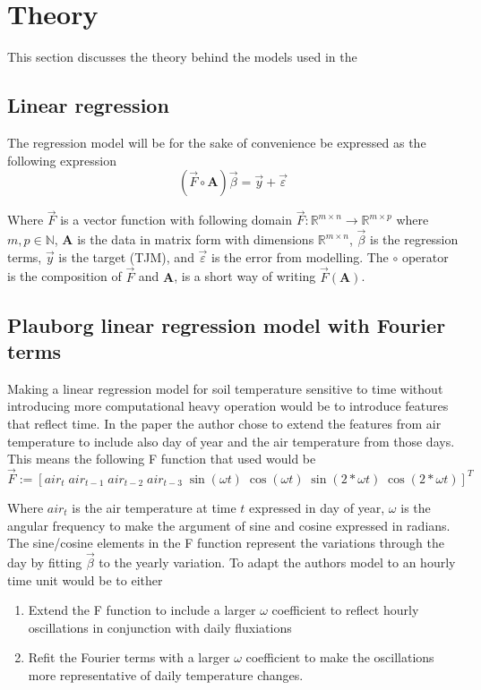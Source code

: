 \section{Theory}\label{sec:theory}

This section discusses the theory behind the models used in the 

\subsection{Linear regression}

The regression model will be for the sake of convenience be expressed as the following expression
$$
\left(\vec{F}\circ \mathbf{A}\right)\vec{\beta}=\vec{y}+\vec{\varepsilon}
$$

Where $\vec{F}$ is a vector function with following domain $\vec{F}:\mathbb{R}^{m\times n}\to \mathbb{R}^{m\times p}$ where $m,p\in \mathbb{N}$, $\mathbf{A}$ is the data in matrix form with dimensions $\mathbb{R}^{m\times n}$, $\vec{\beta}$ is the regression terms, $\vec{y}$ is the target (TJM), and $\vec{\varepsilon}$ is the error from modelling. The $\circ$ operator is the composition of $\vec{F}$ and $\mathbf{A}$, is a short way of writing $\vec{F}(\mathbf{A})$.

\subsection[Plauborg Regression]{Plauborg linear regression model with Fourier terms}

Making a linear regression model for soil temperature sensitive to time without introducing more computational heavy operation would be to introduce features that reflect time. In the paper  the author chose to extend the features from air temperature to include also day of year and the air temperature from those days. This means the following F function that \citeauthor{plauborg_simple_2002} used would be 
$$
\vec{F} := [air_t \; air_{t-1}\; air_{t-2}\; air_{t-3}\; \sin(\omega t) \; \cos(\omega t)\; \sin(2*\omega t)\; \cos(2*\omega t)]^T
$$

Where $air_t$ is the air temperature at time $t$ expressed in day of year, $\omega$ is the angular frequency to make the argument of sine and cosine expressed in radians. The sine/cosine elements in the F function represent the variations through the day by fitting $\vec{\beta}$ to the yearly variation. To adapt the authors model to an hourly time unit would be to either
\begin{enumerate}
	\item Extend the F function to include a larger $\omega$ coefficient to reflect hourly oscillations in conjunction with daily fluxiations
	\item Refit the Fourier terms with a larger $\omega$ coefficient to make the oscillations more representative of daily temperature changes.
\end{enumerate}

